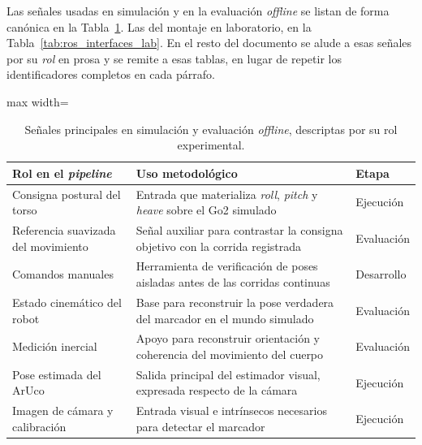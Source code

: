 \documentclass[12pt,a4paper]{report}
\begin{document}
Las señales usadas en simulación y en la evaluación \textit{offline} se listan
de forma canónica en la Tabla~\ref{tab:ros_interfaces_sim}. Las del montaje en
laboratorio, en la Tabla~\ref{tab:ros_interfaces_lab}. En el resto del
documento se alude a esas señales por su \emph{rol} en prosa y se remite a esas
tablas, en lugar de repetir los identificadores completos en cada párrafo.

\begin{table}[H]
\centering
\footnotesize
\caption{Señales principales en simulación y evaluación \textit{offline},
descriptas por su rol experimental.}
\label{tab:ros_interfaces_sim}
\begin{adjustbox}{max width=\textwidth}
\begin{tabular}{p{}p{}p{}}
\toprule
Rol en el \textit{pipeline} & Uso metodológico & Etapa \\
\midrule
Consigna postural del torso & Entrada que materializa \emph{roll}, \emph{pitch} y \emph{heave} sobre el Go2 simulado & Ejecución \\
Referencia suavizada del movimiento & Señal auxiliar para contrastar la consigna objetivo con la corrida registrada & Evaluación \\
Comandos manuales & Herramienta de verificación de poses aisladas antes de las corridas continuas & Desarrollo \\
Estado cinemático del robot & Base para reconstruir la pose verdadera del marcador en el mundo simulado & Evaluación \\
Medición inercial & Apoyo para reconstruir orientación y coherencia del movimiento del cuerpo & Evaluación \\
Pose estimada del ArUco & Salida principal del estimador visual, expresada respecto de la cámara & Ejecución \\
Imagen de cámara y calibración & Entrada visual e intrínsecos necesarios para detectar el marcador & Ejecución \\
\bottomrule
\end{tabular}
\end{adjustbox}
\end{table}
\end{document}

